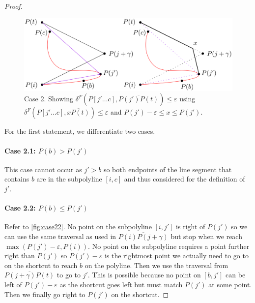 \begin{proof}
	\begin{figure}[b]
		\centering
		\includegraphics[scale=0.1]{./figures/case2.png}
		\caption{Case 2. Showing \(\delta^F(P[j' \dots c], \overline{P(j')P(t)}) \leq \varepsilon\) using \(\delta^F(P[j' \dots c], \overline{xP(t)}) \leq \varepsilon\) and \(P(j') - \varepsilon \leq x \leq P(j')\).}
		\label{fig:case2}
	\end{figure}

	For the first statement, we differentiate two cases.

	\paragraph{Case 2.1: \(P(b) > P(j')\)} 
	This case cannot occur as \(j' > b\) so both endpoints of the line segment that contains \(b\) are in the subpolyline \([i, c]\) and thus considered for the definition of \(j'\).

	\paragraph{Case 2.2: \(P(b) \leq P(j')\)} 
	Refer to \cref{fig:case22}. No point on the subpolyline \([i, j']\) is right of \(P(j')\) so we can use the same traversal as used in \(\overline{P(i)P(j+\gamma)}\) but stop when we reach \(\max(P(j')-\varepsilon, P(i))\). No point on the subpolyline requires a point further right than \(P(j')\) so \(P(j')-\varepsilon\) is the rightmost point we actually need to go to on the shortcut to reach \(b\) on the polyline. Then we use the traversal from \(\overline{P(j+\gamma)P(t)}\) to go to \(j'\). This is possible because no point on \([b, j']\) can be left of \(P(j')-\varepsilon\) as the shortcut goes left but must match \(P(j')\) at some point. Then we finally go right to \(P(j')\) on the shortcut.


\end{proof}
